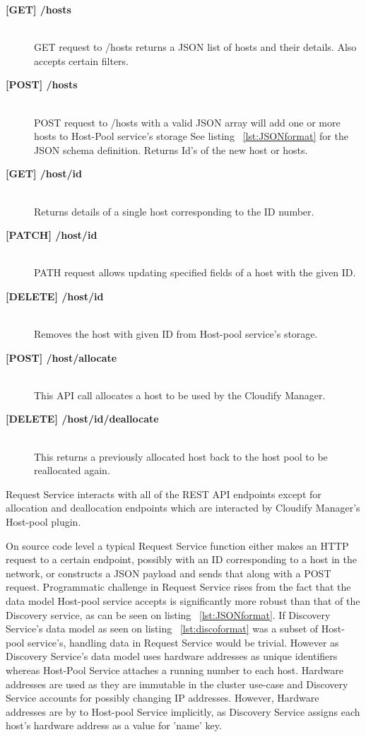 \begin{description}

\item[\textbf{[GET] /hosts}] \hfill \\
GET request to /hosts returns a JSON list of hosts and their details. Also accepts certain filters.

\item[\textbf{[POST] /hosts}] \hfill \\
POST request to /hosts with a valid JSON array will add one or more hosts to Host-Pool service's storage See listing ~\ref{lst:JSONformat} for the JSON schema definition. Returns Id’s of the new host or hosts.

\item[\textbf{[GET] /host/{id}}] \hfill \\
Returns details of a single host corresponding to the ID number.

\item[\textbf{[PATCH] /host/{id}}] \hfill \\
PATH request allows updating specified fields of a host with the given ID.

\item[\textbf{[DELETE] /host/{id}}] \hfill \\
Removes the host with given ID from Host-pool service's storage.

\item[\textbf{[POST] /host/allocate}] \hfill \\
This API call allocates a host to be used by the Cloudify Manager.

\item[\textbf{[DELETE] /host/{id}/deallocate}] \hfill \\
This returns a previously allocated host back to the host pool to be reallocated again.

\end{description}

Request Service interacts with all of the REST API endpoints except for allocation and deallocation endpoints which are interacted by Cloudify Manager's Host-pool plugin.

On source code level a typical Request Service function either makes an HTTP request to a certain endpoint, possibly with an ID corresponding to a host in the network, or constructs a JSON payload and sends that along with a POST request. Programmatic challenge in Request Service rises from the fact that the data model Host-pool service accepts is significantly more robust than that of the Discovery service, as can be seen on listing ~\ref{lst:JSONformat}. If Discovery Service's data model as seen on listing ~\ref{lst:discoformat} was a subset of Host-pool service's, handling data in Request Service would be trivial. However as Discovery Service's data model uses hardware addresses as unique identifiers whereas Host-Pool Service attaches a running number to each host. Hardware addresses are used as they are immutable in the cluster use-case and Discovery Service accounts for possibly changing IP addresses. However, Hardware addresses are by to Host-pool Service implicitly, as Discovery Service assigns each host's hardware address as a value for 'name' key. \pagebreak

